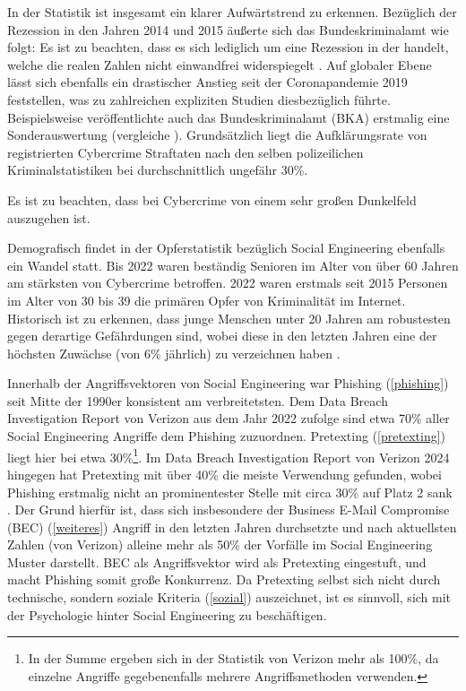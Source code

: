 In der Statistik ist insgesamt ein klarer Aufwärtstrend zu erkennen. Bezüglich der Rezession in den Jahren 2014 und 2015 äußerte sich das Bundeskriminalamt wie folgt:
 Es ist zu beachten, dass es sich lediglich um eine Rezession in der  handelt, welche die realen Zahlen nicht einwandfrei widerspiegelt .
Auf globaler Ebene lässt sich ebenfalls ein drastischer Anstieg seit der Coronapandemie 2019 feststellen, was zu zahlreichen expliziten Studien diesbezüglich führte. Beispielsweise veröffentlichte auch das Bundeskriminalamt (BKA) erstmalig eine Sonderauswertung (vergleiche ).
Grundsätzlich liegt die Aufklärungsrate von registrierten Cybercrime Straftaten nach den selben polizeilichen Kriminalstatistiken bei durchschnittlich ungefähr 30\%.

Es ist zu beachten, dass bei Cybercrime von einem sehr großen Dunkelfeld auszugehen ist. 

Demografisch findet in der Opferstatistik bezüglich Social Engineering ebenfalls ein Wandel statt.
Bis 2022 waren beständig Senioren im Alter von über 60 Jahren am stärksten von Cybercrime betroffen.
2022 waren erstmals seit 2015 Personen im Alter von 30 bis 39 die primären Opfer von Kriminalität im Internet.
Historisch ist zu erkennen, dass junge Menschen unter 20 Jahren am robustesten gegen derartige Gefährdungen sind, wobei diese in den letzten Jahren eine der höchsten Zuwächse (von 6\% jährlich) zu verzeichnen haben . 

Innerhalb der Angriffsvektoren von Social Engineering war Phishing (\autoref{phishing}) seit Mitte der 1990er konsistent am verbreitetsten.
Dem Data Breach Investigation Report von Verizon aus dem Jahr 2022 zufolge sind etwa 70\% aller Social Engineering Angriffe dem Phishing zuzuordnen.
Pretexting (\autoref{pretexting}) liegt hier bei etwa 30\%\footnote{In der Summe ergeben sich in der Statistik von Verizon mehr als 100\%, da einzelne Angriffe gegebenenfalls mehrere Angriffsmethoden verwenden.}.
Im Data Breach Investigation Report von Verizon 2024 hingegen hat Pretexting mit über 40\% die meiste Verwendung gefunden, wobei Phishing erstmalig nicht an prominentester Stelle mit circa 30\% auf Platz 2 sank .
Der Grund hierfür ist, dass sich insbesondere der Business E-Mail Compromise (BEC) (\autoref{weiteres}) Angriff in den letzten Jahren durchsetzte und nach aktuellsten Zahlen (von Verizon) alleine mehr als 50\% der Vorfälle im Social Engineering Muster darstellt.
BEC als Angriffsvektor wird als Pretexting eingestuft, und macht Phishing somit große Konkurrenz. Da Pretexting selbst sich nicht durch technische, sondern soziale Kriteria (\autoref{sozial}) auszeichnet, ist es sinnvoll, sich mit der Psychologie hinter Social Engineering zu beschäftigen.

